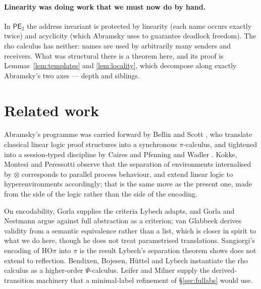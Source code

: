 \documentclass[11pt]{article}
\theoremstyle{definition}
\theoremstyle{plain}
\theoremstyle{remark}
\begin{document}
\paragraph{Linearity was doing work that we must now do by hand.}
In $\mathsf{PE}_2$ the address invariant is protected by linearity (each
name occurs exactly twice) and acyclicity (which Abramsky uses to
guarantee deadlock freedom). The rho calculus has neither: names are used
by arbitrarily many senders and receivers. What was structural there is a
theorem here, and its proof is Lemmas~\ref{lem:templates} and
\ref{lem:locality}, which decompose along exactly Abramsky's two axes ---
depth and siblings.

\section{Related work}\label{sec:related}

Abramsky's programme was carried forward by Bellin and Scott
\cite{BellinScott94}, who translate classical linear logic proof
structures into a synchronous $\pi$-calculus, and tightened into a
session-typed discipline by Caires and Pfenning \cite{CairesPfenning10}
and Wadler \cite{Wadler14}. Kokke, Montesi and Peressotti \cite{HCP}
observe that the separation of environments internalised by $\otimes$
corresponds to parallel process behaviour, and extend linear logic to
hyperenvironments accordingly; that is the same move as the present one,
made from the side of the logic rather than the side of the encoding.

On encodability, Gorla \cite{Gorla10} supplies the criteria Lybech adapts,
and Gorla and Nestmann \cite{GorlaNestmann14} argue against full
abstraction as a criterion; van Glabbeek \cite{Glabbeek18} derives
validity from a semantic equivalence rather than a list, which is closer
in spirit to what we do here, though he does not treat parametrised
translations. Sangiorgi's encoding of HO$\pi$ into $\pi$
\cite{Sangiorgi93} is the result Lybech's separation theorem shows does
not extend to reflection. Bendixen, Bojesen, H\"uttel and Lybech
\cite{Psi} instantiate the rho calculus as a higher-order $\Psi$-calculus.
Leifer and Milner \cite{LeiferMilner00} supply the derived-transition
machinery that a minimal-label refinement of \S\ref{sec:fullabs} would
use.

\end{document}

